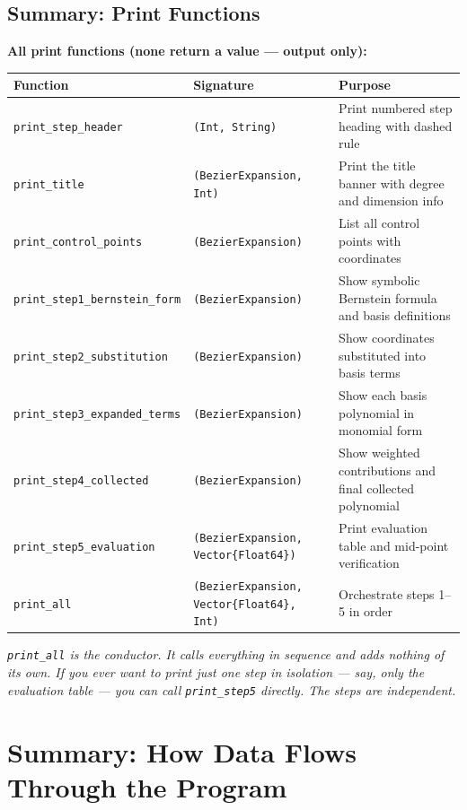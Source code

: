 \documentclass[12pt, a4paper]{article}
\newcommand{\cd}[1]{\texttt{#1}}
\begin{document}
\subsection*{Summary: Print Functions}

\begin{notebox}
\textbf{All print functions (none return a value --- output only):}

\medskip
\begin{tabular}{lp{4.8cm}p{5cm}}
\toprule
Function & Signature & Purpose \\
\midrule
\cd{print\_step\_header} &
  \cd{(Int, String)} &
  Print numbered step heading with dashed rule \\[4pt]
\cd{print\_title} &
  \cd{(BezierExpansion, Int)} &
  Print the title banner with degree and dimension info \\[4pt]
\cd{print\_control\_points} &
  \cd{(BezierExpansion)} &
  List all control points with coordinates \\[4pt]
\cd{print\_step1\_bernstein\_form} &
  \cd{(BezierExpansion)} &
  Show symbolic Bernstein formula and basis definitions \\[4pt]
\cd{print\_step2\_substitution} &
  \cd{(BezierExpansion)} &
  Show coordinates substituted into basis terms \\[4pt]
\cd{print\_step3\_expanded\_terms} &
  \cd{(BezierExpansion)} &
  Show each basis polynomial in monomial form \\[4pt]
\cd{print\_step4\_collected} &
  \cd{(BezierExpansion)} &
  Show weighted contributions and final collected polynomial \\[4pt]
\cd{print\_step5\_evaluation} &
  \cd{(BezierExpansion, Vector\{Float64\})} &
  Print evaluation table and mid-point verification \\[4pt]
\cd{print\_all} &
  \cd{(BezierExpansion, Vector\{Float64\}, Int)} &
  Orchestrate steps 1--5 in order \\
\bottomrule
\end{tabular}

\medskip
\textit{\cd{print\_all} is the conductor.
It calls everything in sequence and adds nothing of its own.
If you ever want to print just one step in isolation ---
say, only the evaluation table --- you can call \cd{print\_step5}
directly. The steps are independent.}
\end{notebox}


\section{Summary: How Data Flows Through the Program}
\end{document}
